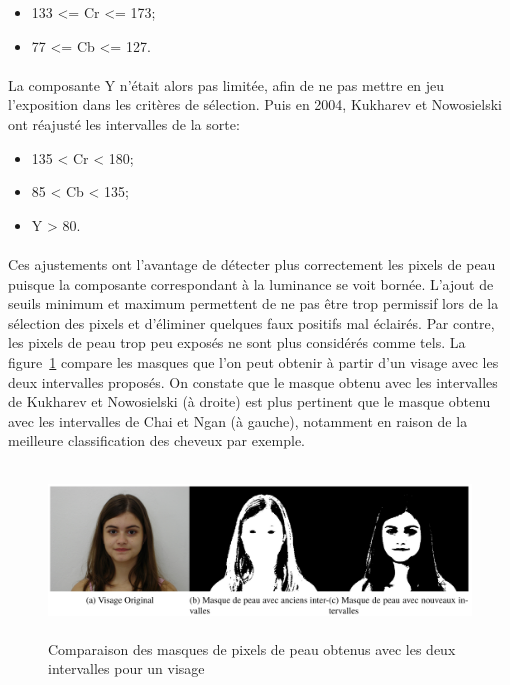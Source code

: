 \documentclass[11pt, french,screen]{report-rd-info}
\begin{document}
\begin{itemize}
\item 133 <= Cr <= 173;
\item 77 <= Cb <= 127.
\end{itemize}

\paragraph*{}
La composante Y n'était alors pas limitée, afin de ne pas mettre en jeu l'exposition dans les critères de sélection.
Puis en 2004, Kukharev et Nowosielski \cite{Kukharev2004} ont réajusté les intervalles de la sorte:

\begin{itemize}
\item 135 < Cr < 180;
\item 85 < Cb < 135;
\item Y > 80.
\end{itemize}

\paragraph*{}
Ces ajustements ont l'avantage de détecter plus correctement les pixels de peau puisque la composante correspondant à la luminance se voit bornée. L'ajout de seuils minimum et maximum permettent de ne pas être trop permissif lors de la sélection des pixels et d'éliminer quelques faux positifs mal éclairés. Par contre, les pixels de peau trop peu exposés ne sont plus considérés comme tels. La figure~\ref{fig:IntervalleMasquePeau1} compare les masques que l'on peut obtenir à partir d'un visage avec les deux intervalles proposés. On constate que le masque obtenu avec les intervalles de Kukharev et Nowosielski \cite{Kukharev2004} (à droite) est plus pertinent que le masque obtenu avec les intervalles de Chai et Ngan \cite{Chai1999} (à gauche), notamment en raison de la meilleure classification des cheveux par exemple.

\begin{figure}
\centering
\includegraphics[height=4.5cm,width=15cm]{Images/ea_compmasque}
\caption{Comparaison des masques de pixels de peau obtenus avec les deux intervalles pour un visage}
 \label{fig:IntervalleMasquePeau1}
\end{figure}
\end{document}
